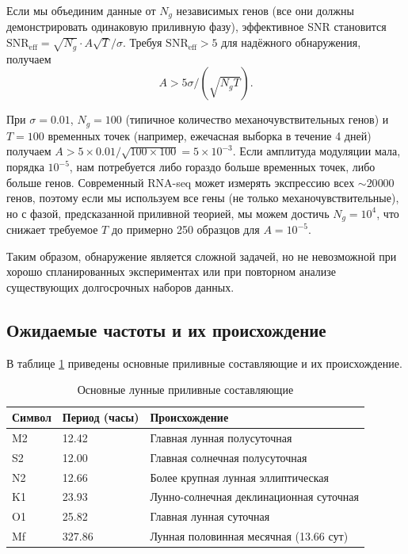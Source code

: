 \documentclass[12pt,a4paper]{article}
\theoremstyle{remark}
\begin{document}
	Если мы объединим данные от \(N_g\) независимых генов (все они должны демонстрировать одинаковую приливную фазу), эффективное SNR становится \(\mathrm{SNR}_{\text{eff}} = \sqrt{N_g} \cdot A \sqrt{T} / \sigma\). Требуя \(\mathrm{SNR}_{\text{eff}} > 5\) для надёжного обнаружения, получаем
	\[
	A > 5 \sigma / (\sqrt{N_g T}).
	\]
	
	При \(\sigma = 0.01\), \(N_g = 100\) (типичное количество механочувствительных генов) и \(T = 100\) временных точек (например, ежечасная выборка в течение 4 дней) получаем \(A > 5\times 0.01 / \sqrt{100\times 100} = 5\times 10^{-3}\). Если амплитуда модуляции мала, порядка \(10^{-5}\), нам потребуется либо гораздо больше временных точек, либо больше генов. Современный RNA-seq может измерять экспрессию всех \(\sim 20 000\) генов, поэтому если мы используем все гены (не только механочувствительные), но с фазой, предсказанной приливной теорией, мы можем достичь \(N_g = 10^4\), что снижает требуемое \(T\) до примерно 250 образцов для \(A = 10^{-5}\).
	
	Таким образом, обнаружение является сложной задачей, но не невозможной при хорошо спланированных экспериментах или при повторном анализе существующих долгосрочных наборов данных.
	
	\subsection{Ожидаемые частоты и их происхождение}
	
	В таблице \ref{tab:tides} приведены основные приливные составляющие и их происхождение.
	
	\begin{table}[htbp]
		\centering
		\caption{Основные лунные приливные составляющие}
		\label{tab:tides}
		\small
		\begin{tabular}{lll}
			\toprule
			Символ & Период (часы) & Происхождение \\
			\midrule
			M2 & 12.42 & Главная лунная полусуточная \\
			S2 & 12.00 & Главная солнечная полусуточная \\
			N2 & 12.66 & Более крупная лунная эллиптическая \\
			K1 & 23.93 & Лунно-солнечная деклинационная суточная \\
			O1 & 25.82 & Главная лунная суточная \\
			Mf & 327.86 & Лунная половинная месячная (13.66 сут) \\
			\bottomrule
		\end{tabular}
	\end{table}
	
\end{document}
